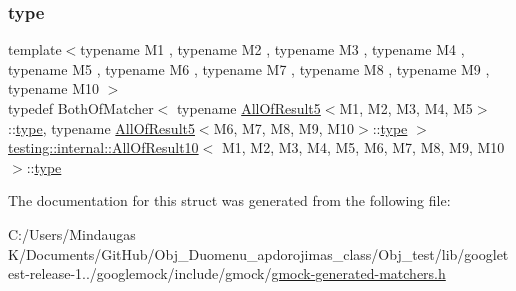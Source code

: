 \subsubsection{\texorpdfstring{type}{type}}
{\footnotesize\ttfamily template$<$typename M1 , typename M2 , typename M3 , typename M4 , typename M5 , typename M6 , typename M7 , typename M8 , typename M9 , typename M10 $>$ \\
typedef Both\+Of\+Matcher$<$ typename \mbox{\hyperlink{structtesting_1_1internal_1_1_all_of_result5}{All\+Of\+Result5}}$<$M1, M2, M3, M4, M5$>$\+::\mbox{\hyperlink{structtesting_1_1internal_1_1_all_of_result10_a48d6c6de6d0d5445b212119e1f536af5}{type}}, typename \mbox{\hyperlink{structtesting_1_1internal_1_1_all_of_result5}{All\+Of\+Result5}}$<$M6, M7, M8, M9, M10$>$\+::\mbox{\hyperlink{structtesting_1_1internal_1_1_all_of_result10_a48d6c6de6d0d5445b212119e1f536af5}{type}} $>$ \mbox{\hyperlink{structtesting_1_1internal_1_1_all_of_result10}{testing\+::internal\+::\+All\+Of\+Result10}}$<$ M1, M2, M3, M4, M5, M6, M7, M8, M9, M10 $>$\+::\mbox{\hyperlink{structtesting_1_1internal_1_1_all_of_result10_a48d6c6de6d0d5445b212119e1f536af5}{type}}}



The documentation for this struct was generated from the following file\+:\begin{DoxyCompactItemize}
\item 
C\+:/\+Users/\+Mindaugas K/\+Documents/\+Git\+Hub/\+Obj\+\_\+\+Duomenu\+\_\+apdorojimas\+\_\+class/\+Obj\+\_\+test/lib/googletest-\/release-\/1../googlemock/include/gmock/\mbox{\hyperlink{_obj__test_2lib_2googletest-release-1_88_81_2googlemock_2include_2gmock_2gmock-generated-matchers_8h}{gmock-\/generated-\/matchers.\+h}}\end{DoxyCompactItemize}
